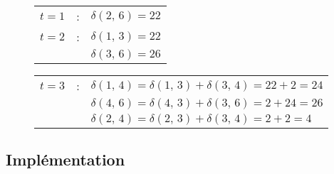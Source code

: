 \begin{figure}[h]
\centering
\begin{minipage}{.5\textwidth}
	\centering
	\begin{tabular}{c c l}
		$t = 1$ & : & $\delta(2,\, 6) = 22$ \\
		$t = 2$ & : & $\delta(1,\, 3) = 22$ \\
		& & $\delta(3,\, 6) = 26$
	\end{tabular}
\end{minipage}%
\begin{minipage}{.5\textwidth}
	\centering
	\begin{tabular}{c c l}
		$t = 3$ & : &$\delta(1,\, 4) = \delta(1,\, 3) + \delta(3,\, 4) = 22 + 2 = 24$ \\
		& & $\delta(4,\, 6) = \delta(4,\, 3) + \delta(3,\, 6) = 2 + 24 = 26$ \\
		& & $\delta(2,\, 4) = \delta(2,\, 3) + \delta(3,\, 4) = 2 + 2 = 4$
	\end{tabular}
\end{minipage}%
\end{figure}

\subsection*{Implémentation}
